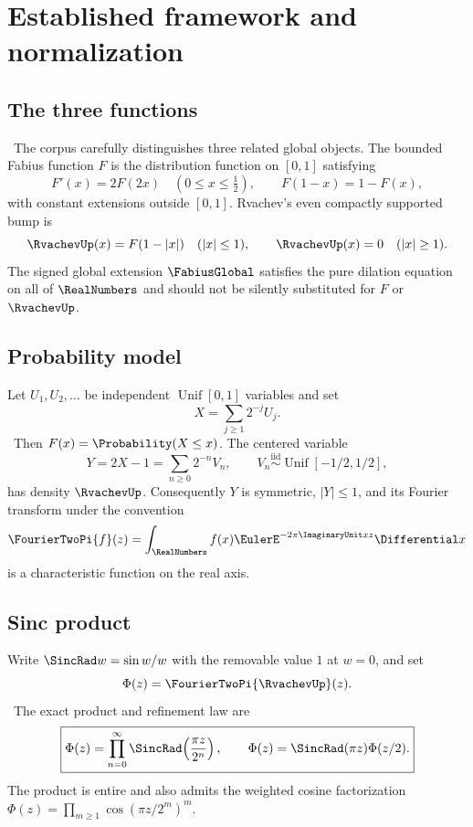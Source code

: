 \documentclass[11pt]{article}
\numberwithin{equation}{section}
\theoremstyle{definition}
\theoremstyle{remark}
\begin{document}
\section{Established framework and normalization}

\subsection{The three functions}
\statusE\ The corpus carefully distinguishes three related global objects.
The bounded Fabius function $F$ is the distribution function on $[0,1]$ satisfying
\[
 F'(x)=2F(2x)\quad(0\le x\le\tfrac12),\qquad
 F(1-x)=1-F(x),
\]
with constant extensions outside $[0,1]$.  Rvachev's even compactly supported bump is
\[
 \RvachevUp(x)=F(1-|x|)\quad(|x|\le1),\qquad \RvachevUp(x)=0\quad(|x|\ge1).
\]
The signed global extension $\FabiusGlobal$ satisfies the pure dilation equation on all of
$\RealNumbers$ and should not be silently substituted for $F$ or $\RvachevUp$.

\subsection{Probability model}
Let $U_1,U_2,\ldots$ be independent $\operatorname{Unif}[0,1]$ variables and set
\begin{equation}
 X=\sum_{j\ge1}2^{-j}U_j.                                  \label{p9:eq:X}
\end{equation}
\statusE\ Then $F(x)=\Probability(X\le x)$.  The centered variable
\begin{equation}
 Y=2X-1=\sum_{n\ge0}2^{-n}V_n,
 \qquad V_n\overset{\mathrm{iid}}\sim\operatorname{Unif}[-1/2,1/2], \label{p9:eq:Y}
\end{equation}
has density $\RvachevUp$.  Consequently $Y$ is symmetric, $|Y|\le1$, and its Fourier transform
under the convention
\[
 \FourierTwoPi{f}(z)=\int_\RealNumbers f(x)\EulerE^{-2\pi\ImaginaryUnit xz}\Differential x
\]
is a characteristic function on the real axis.

\subsection{Sinc product}
Write $\SincRad w=\sin w/w$ with the removable value $1$ at $w=0$, and set
\begin{equation}
 \Phi(z)=\FourierTwoPi{\RvachevUp}(z).
\end{equation}
\statusE\ The exact product and refinement law are
\begin{equation}
 \boxed{\Phi(z)=\prod_{n=0}^{\infty}\SincRad\!\left(\frac{\pi z}{2^n}\right),
 \qquad \Phi(z)=\SincRad(\pi z)\Phi(z/2).}                    \label{p9:eq:Phi-sinc}
\end{equation}
The product is entire and also admits the weighted cosine factorization
$\Phi(z)=\prod_{m\ge1}\cos(\pi z/2^m)^m$.
\end{document}
